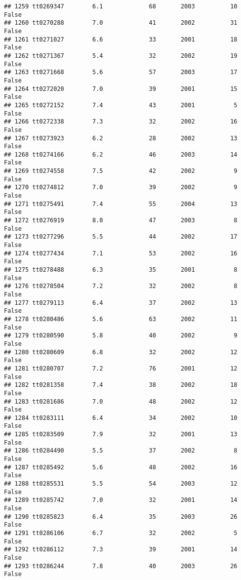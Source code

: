 \documentclass[
]{article}
\begin{document}
\begin{verbatim}
## 1259 tt0269347        6.1             68       2003          10   False
## 1260 tt0270288        7.0             41       2002          31   False
## 1261 tt0271027        6.6             33       2001          18   False
## 1262 tt0271367        5.4             32       2002          19   False
## 1263 tt0271668        5.6             57       2003          17   False
## 1264 tt0272020        7.0             39       2001          15   False
## 1265 tt0272152        7.4             43       2001           5   False
## 1266 tt0272338        7.3             32       2002          16   False
## 1267 tt0273923        6.2             28       2002          13   False
## 1268 tt0274166        6.2             46       2003          14   False
## 1269 tt0274558        7.5             42       2002           9   False
## 1270 tt0274812        7.0             39       2002           9   False
## 1271 tt0275491        7.4             55       2004          13   False
## 1272 tt0276919        8.0             47       2003           8   False
## 1273 tt0277296        5.5             44       2002          17   False
## 1274 tt0277434        7.1             53       2002          16   False
## 1275 tt0278488        6.3             35       2001           8   False
## 1276 tt0278504        7.2             32       2002           8   False
## 1277 tt0279113        6.4             37       2002          13   False
## 1278 tt0280486        5.6             63       2002          11   False
## 1279 tt0280590        5.8             40       2002           9   False
## 1280 tt0280609        6.8             32       2002          12   False
## 1281 tt0280707        7.2             76       2001          12   False
## 1282 tt0281358        7.4             38       2002          18   False
## 1283 tt0281686        7.0             48       2002          12   False
## 1284 tt0283111        6.4             34       2002          10   False
## 1285 tt0283509        7.9             32       2001          13   False
## 1286 tt0284490        5.5             37       2002           8   False
## 1287 tt0285492        5.6             48       2002          16   False
## 1288 tt0285531        5.5             54       2003          12   False
## 1289 tt0285742        7.0             32       2001          14   False
## 1290 tt0285823        6.4             35       2003          26   False
## 1291 tt0286106        6.7             32       2002           5   False
## 1292 tt0286112        7.3             39       2001          14   False
## 1293 tt0286244        7.8             40       2003          26   False

\end{verbatim}
\end{document}
